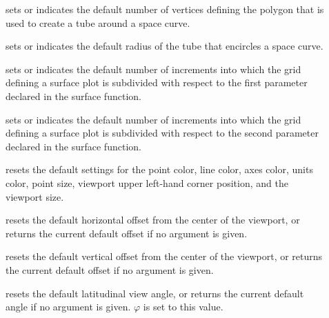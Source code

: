 \begin{description}
%
\item[]
sets or indicates the default number of
vertices defining the polygon that is used to create a tube around
a space curve.

%
\item[]
sets or indicates the default radius of
the tube that encircles a space curve.

%
\item[]
sets or indicates the default number of
increments into which the grid defining a surface plot is subdivided with
respect to the first parameter declared in the surface function.

%
\item[]
sets or indicates the default number of
increments into which the grid defining a surface plot is subdivided with
respect to the second parameter declared in the surface function.

%
\item[]
resets the default settings for the
point color, line color, axes color, units color, point size,
viewport upper left-hand corner position, and the viewport size.

%
\item[]
resets the default horizontal offset
from the center of the viewport, or returns the current default offset if no argument is given.

%
\item[]
resets the default vertical offset
from the center of the viewport, or returns the current default offset if no argument is given.

%
\item[]
resets the default latitudinal view angle,
or returns the current default angle if no argument is given.
$\varphi$ is set to this value.


\end{description}
